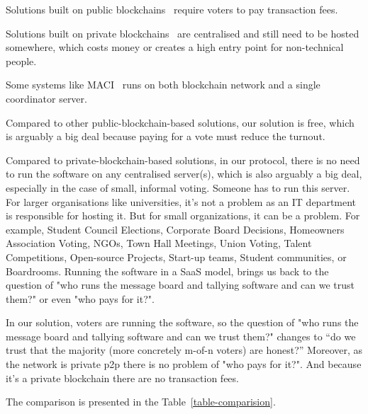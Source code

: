 \documentclass[runningheads]{llncs}
\begin{document}
Solutions built on public blockchains~\cite{mccorrySmartContractBoardroom2017,ethereumfoundationMinimalAntiCollusionInfrastructure2022,elsheikhDisputefreeScalableOpen2022} require voters to pay transaction fees.

Solutions built on private blockchains~\cite{mooreWestVirginiaMobile2019,PolysOnlineVoting,SecureDecentralizedApplication2023,chaiebVerifyYourVoteVerifiableBlockchainBased2019} %
are centralised and still need to be hosted somewhere, which costs money or creates a high entry point for non-technical people.

Some systems like MACI~\cite{ethereumfoundationMinimalAntiCollusionInfrastructure2022,PrivacyscalingexplorationsMaci2023} runs on both blockchain network and a single coordinator server.

Compared to other public-blockchain-based solutions, our solution is free, which is arguably a big deal because paying for a vote must reduce the turnout.

Compared to private-blockchain-based solutions, in our protocol, there is no need to run the software on any centralised server(s), which is also arguably a big deal, especially in the case of small, informal voting. Someone has to run this server. For larger organisations like universities, it's not a problem as an IT department is responsible for hosting it. But for small organizations, it can be a problem. For example, Student Council Elections, Corporate Board Decisions, Homeowners Association Voting, NGOs, Town Hall Meetings, Union Voting, Talent Competitions, Open-source Projects, Start-up teams, Student communities, or Boardrooms. Running the software in a SaaS model, brings us back to the question of "who runs the message board and tallying software and can we trust them?" or even "who pays for it?".

In our solution, voters are running the software, so the question of "who runs the message board and tallying software and can we trust them?" changes to “do we trust that the majority (more concretely m-of-n voters) are honest?” Moreover, as the network is private p2p there is no problem of "who pays for it?". And because it's a private blockchain there are no transaction fees.

The comparison is presented in the Table~\ref{table-comparision}.

\newcommand{\fullmoon}{\tikz\filldraw[fill=black] (0,0) circle (0.5em);}
\newcommand{\newmoon}{\tikz\draw (0,0) circle (0.5em);}
\newcommand{\rightmoon}{\tikz\draw (0,0) circle (0.5em); \filldraw[fill=black] (0,0) arc (90:270:0.5em) -- cycle;}
\newcommand{\leftmoon}{\tikz\draw (0,0) circle (0.5em); \filldraw[fill=black] (0,0) arc (270:90:0.5em) -- cycle;}
\newcommand{\halfmoon}{\tikz\draw (0,0) circle (0.5em); \filldraw[fill=black] (0,-0.5em) rectangle (0,0.5em);}
\end{document}
